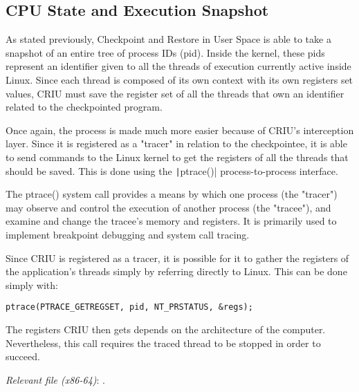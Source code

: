 \subsection*{CPU State and Execution Snapshot}
As stated previously, Checkpoint and Restore in User Space is able to take a snapshot of an entire tree of process IDs (pid). Inside the kernel, these pids represent an identifier given to all the threads of execution currently active inside Linux. Since each thread is composed of its own context with its own registers set values, CRIU must save the register set of all the threads that own an identifier related to the checkpointed program.

Once again, the process is made much more easier because of CRIU's interception layer. Since it is registered as a "tracer" in relation to the checkpointee, it is able to send commands to the Linux kernel to get the registers of all the threads that should be saved. This is done using the \texttt|ptrace()| process-to-process interface.
\begin{shadedquotation}
The ptrace() system call provides a means by which one process (the "tracer") may observe and control the execution of another process (the "tracee"), and examine and change the tracee's memory and registers.  It is primarily used to implement breakpoint debugging and system call tracing.
\cite{on:ptrace}
\end{shadedquotation}
Since CRIU is registered as a tracer, it is possible for it to gather the registers of the application's threads simply by referring directly to Linux. This can be done simply with:
\begin{verbatim}
ptrace(PTRACE_GETREGSET, pid, NT_PRSTATUS, &regs);
\end{verbatim}
The registers CRIU then gets depends on the architecture of the computer. Nevertheless, this call requires the traced thread to be stopped in order to succeed.

\hfill\textit{Relevant file (x86-64)}: .

